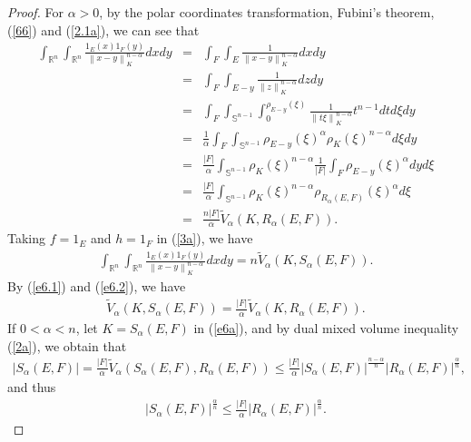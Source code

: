 \documentclass[preprint,12pt]{elsarticle}
\begin{document}
\begin{proof}
For $\alpha >0$, by the polar coordinates transformation, Fubini’s theorem, (\ref{66}) and (\ref{2.1a}), we can see that
\begin{eqnarray}\label{e6.1}
\int_{\mathbb{R}^n}\int_{\mathbb{R}^n}\frac{1_{E}(x)1_{F}(y)}{{\left \| x-y\right \|}_{K }^{n-\alpha}}dxdy&=&\int_{F}\int_{E}\frac{1}{{\left \| x-y\right \|}_{K }^{n-\alpha}}dxdy\nonumber\\
&=& \int_{F}\int_{E-y}\frac{1}{{{\left \| z\right \|}_{K }^{n-\alpha}}}dzdy\nonumber\\
&=&\int_{F}\int_{\mathbb{S}^{n-1}}\int_{0}^{{{\rho}_{E-y} (\xi)} }\frac{1}{{\left \|t\xi\right \|}_{K }^{n-\alpha}}{t}^{n-1}dtd\xi dy \nonumber\\
&=&\frac{1}{\alpha }\int_{F}\int_{\mathbb{S}^{n-1}}{{\rho}_{E-y} (\xi)}^{\alpha }{{\rho}_{K} (\xi)}^{n-\alpha }d\xi dy\nonumber\\
&=&\frac{|F|}{\alpha }\int_{\mathbb{S}^{n-1}}{{\rho}_{K} (\xi)}^{n-\alpha }\frac{1}{|F|}\int_{F}{{\rho}_{E-y} (\xi)}^{\alpha }dyd\xi\nonumber\\
&=&\frac{|F|}{\alpha }\int_{\mathbb{S}^{n-1}}{{\rho}_{K} (\xi)}^{n-\alpha }{{\rho}_{{R}_{\alpha }(E,F)} (\xi)}^{\alpha }d\xi\nonumber\\
&=&\frac{n|F|}{\alpha }\widetilde{V}_{\alpha} (K,{R}_{\alpha }(E,F)).
\end{eqnarray} 
Taking $f=1_{E}$ and $h=1_{F}$ in (\ref{3a}), we have
\begin{eqnarray}\label{e6.2}
\int_{\mathbb{R}^n}\int_{\mathbb{R}^n}\frac{1_{E}(x)1_{F}(y)}{{\left \| x-y\right \|}_{K }^{n-\alpha}}dxdy=n\widetilde{V}_{\alpha}(K,{S}_{\alpha }(E,F)).
\end{eqnarray}
By (\ref{e6.1}) and (\ref{e6.2}), we have
\begin{eqnarray}\label{e6a}
\widetilde{V}_{\alpha} (K,{S}_{\alpha }(E,F))=\frac{|F|}{\alpha }\widetilde{V}_{\alpha} (K,{R}_{\alpha }(E,F)).
\end{eqnarray} 
If $0<\alpha <n$, let $K={S}_{\alpha }(E,F)$ in (\ref{e6a}), and by dual mixed volume inequality (\ref{2a}), we obtain that
\begin{eqnarray*}
|{S}_{\alpha }(E,F)|=\frac{|F|}{\alpha }\widetilde{V}_{\alpha}({S}_{\alpha }(E,F),{R}_{\alpha }(E,F))\le \frac{|F|}{\alpha }|{S}_{\alpha }(E,F)|^{\frac{n-\alpha}{n}}|{R}_{\alpha }(E,F)|^{\frac{\alpha}{n}}, 
\end{eqnarray*} 
and thus
\begin{eqnarray}\label{6b}
|{S}_{\alpha }(E,F)|^{\frac{\alpha}{n}}\le \frac{|F|}{\alpha }|{R}_{\alpha }(E,F)|^{\frac{\alpha}{n}}.

\end{eqnarray}
\end{proof}
\end{document}
